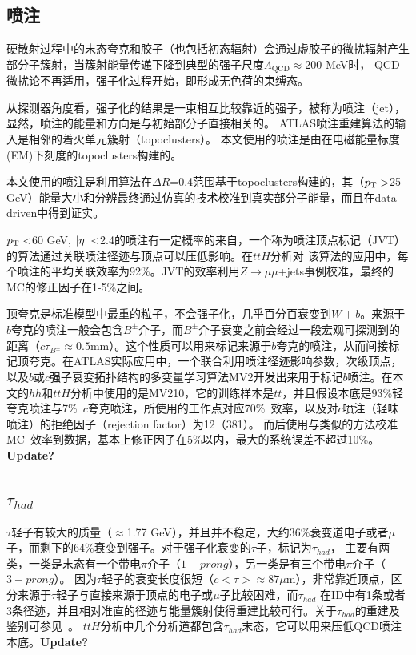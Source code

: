 \subsection{喷注}\label{subsec:jet_reco}
硬散射过程中的末态夸克和胶子（也包括初态辐射）会通过虚胶子的微扰辐射产生部分子簇射，当簇射能量传递下降到典型的强子尺度$\Lambda_{\text{QCD}}\approx$200 MeV时，%
QCD微扰论不再适用，强子化过程开始，即形成无色荷的束缚态。

从探测器角度看，强子化的结果是一束相互比较靠近的强子，被称为喷注（jet），显然，喷注的能量和方向是与初始部分子直接相关的。
ATLAS喷注重建算法的输入是相邻的着火单元簇射（topoclusters）\cite{Aad:2016upy}。
本文使用的喷注是由在电磁能量标度(EM)下刻度的topoclusters构建的。

本文使用的喷注是利用\antikt 算法\cite{Cacciari:2008gp}在$\Delta R$=0.4范围基于topoclusters构建的，其（$p_{\text{T}}>$25 GeV）能量大小和分辨最终通过仿真的技术校准到真实部分子能量，而且在data-driven中得到证实\cite{TheATLAScollaboration:2015soq,TheATLAScollaboration:2013pia}。

$p_{\text{T}}<$60 GeV, $|\eta|<$2.4的喷注有一定概率的来自\pileup ，一个称为喷注顶点标记（JVT）\cite{ATLAS:2014cva}的算法通过关联喷注径迹与顶点可以压低\pileup 影响。在$t\bar{t}H$分析对
该算法的应用中，每个喷注的平均关联效率为92\%。JVT的效率利用$Z\rightarrow \mu\mu$+jets事例校准，最终的MC的修正因子在1-5\%之间。

顶夸克是标准模型中最重的粒子，不会强子化，几乎百分百衰变到$W+b$。来源于$b$夸克的喷注一般会包含$B^{\pm}$介子，而$B^{\pm}$介子衰变之前会经过一段宏观可探测到的距离（$c\tau_{B^{\pm}}\approx0.5\text{mm}$）。这个性质可以用来标记来源于$b$夸克的喷注，从而间接标记顶夸克。在ATLAS实际应用中，一个联合利用喷注径迹影响参数，次级顶点，
以及$b$或$c$强子衰变拓扑结构的多变量学习算法MV2\cite{ATL-PHYS-PUB-2015-022,ATL-PHYS-PUB-2016-012}开发出来用于标记$b$喷注。在本文的$hh$和$t\bar{t}H$分析中使用的是MV210，它的训练样本是$t\bar{t}$，并且假设本底是93\%轻
夸克喷注与7\%~$c$夸克喷注，所使用的工作点对应70\%~\btag 效率，以及对$c$喷注（轻味喷注）的拒绝因子（rejection factor）为12（381）。
而后使用与\RunOne 类似的方法\cite{Aad:2015ydr}校准MC~\btag 效率到数据，基本上修正因子在5\%以内，最大的系统误差不超过10\%。\textbf{Update?}

\subsection{$\tau_{had}$}
$\tau$轻子有较大的质量（$\approx$1.77 GeV），并且并不稳定，大约36\%衰变道电子或者$\mu$子，而剩下的64\%衰变到强子。对于强子化衰变的$\tau$子，标记为$\tau_{had}$，
主要有两类，一类是末态有一个带电$\pi$介子（$1-prong$），另一类是有三个带电$\pi$介子（$3-prong$）。
因为$\tau$轻子的衰变长度很短（$c<\tau>\approx87\mu$m），非常靠近顶点，区分来源于$\tau$轻子与直接来源于顶点的电子或$\mu$子比较困难，而$\tau_{had}$
在ID中有1条或者3条径迹，并且相对准直的径迹与能量簇射使得重建比较可行。关于$\tau_{had}$的重建及鉴别可参见~\cite{ATL-PHYS-PUB-2015-045}。
$tt\bar{H}$分析中几个分析道都包含$\tau_{had}$末态，它可以用来压低QCD喷注本底。\textbf{Update?}

